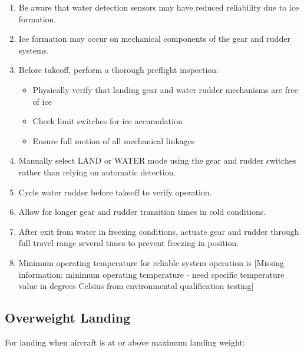 \documentclass[12pt,a4paper,twoside,openright]{book}
\begin{document}
\begin{enumerate}
    \item Be aware that water detection sensors may have reduced reliability due to ice formation.
    \item Ice formation may occur on mechanical components of the gear and rudder systems.
    \item Before takeoff, perform a thorough preflight inspection:
\begin{itemize}
        \item Physically verify that landing gear and water rudder mechanisms are free of ice
        \item Check limit switches for ice accumulation
        \item Ensure full motion of all mechanical linkages
\end{itemize}
    \item Manually select LAND or WATER mode using the gear and rudder switches rather than relying on automatic detection.
    \item Cycle water rudder before takeoff to verify operation.
    \item Allow for longer gear and rudder transition times in cold conditions.
    \item After exit from water in freezing conditions, actuate gear and rudder through full travel range several times to prevent freezing in position.
    \item Minimum operating temperature for reliable system operation is {\color{red}[Missing information: minimum operating temperature - need specific temperature value in degrees Celsius from environmental qualification testing]}
\end{enumerate}

\subsection{Overweight Landing}

For landing when aircraft is at or above maximum landing weight:
\end{document}
